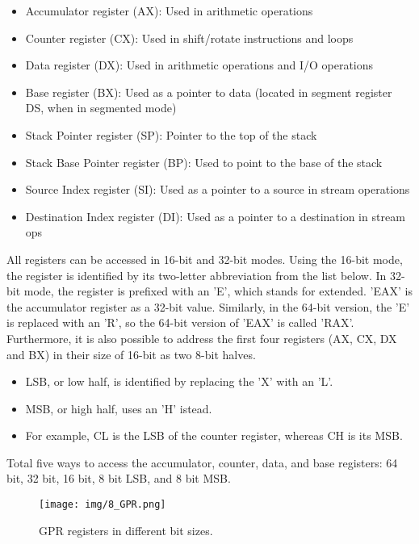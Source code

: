 \begin{itemize}
    \item Accumulator register (AX): Used in arithmetic operations
    \item Counter register (CX): Used in shift/rotate instructions and loops
    \item Data register (DX): Used in arithmetic operations and I/O operations
    \item Base register (BX): Used as a pointer to data (located in segment register DS, when in segmented mode)
    \item Stack Pointer register (SP): Pointer to the top of the stack
    \item Stack Base Pointer register (BP): Used to point to the base of the stack
    \item Source Index register (SI): Used as a pointer to a source in stream operations
    \item Destination Index register (DI): Used as a pointer to a destination in stream ops
\end{itemize}

All registers can be accessed in 16-bit and 32-bit modes. 
Using the 16-bit mode, the register is identified by its two-letter abbreviation from the list below. In 32-bit mode, the register is prefixed with an 'E', which stands for extended. 'EAX' is the accumulator register as a 32-bit value. 
Similarly, in the 64-bit version, the 'E' is replaced with an 'R', so the 64-bit version of 'EAX' is called 'RAX'. Furthermore, it is also possible to address the first four registers (AX, CX, DX and BX) in their size of 16-bit as two 8-bit halves. 
\begin{itemize}
    \item LSB, or low half, is identified by replacing the 'X' with an 'L'. 
    \item MSB, or high half, uses an 'H' istead. 
    \item For example, CL is the LSB of the counter register, whereas CH is its MSB.
\end{itemize}

Total five ways to access the accumulator, counter, data, and base registers: 64
bit, 32 bit, 16 bit, 8 bit LSB, and 8 bit MSB.

\begin{figure}[h!]
\centering
\texttt{[image: img/8\_GPR.png]}\caption{GPR registers in different bit sizes.}
\label{fig:GPR}
\end{figure}

